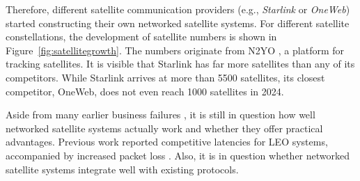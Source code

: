 Therefore, different satellite communication providers (e.g., \textit{Starlink} or \textit{OneWeb}) started constructing their own networked satellite systems.
For different satellite constellations, the development of satellite numbers is shown in Figure~\ref{fig:satellitegrowth}. The numbers originate from N2YO \cite{N2YO2024}, a platform for tracking satellites.
It is visible that Starlink has far more satellites than any of its competitors. While Starlink arrives at more than 5500 satellites, its closest competitor, OneWeb, does not even reach 1000 satellites in 2024.

Aside from many earlier business failures \cite{Chan2002, Barboza2000}, it is still in question how well networked satellite systems actually work and whether they offer practical advantages. Previous work reported competitive latencies for \ac{LEO} systems, accompanied by increased packet loss \cite{DBLP:conf/imc/MichelTGB22}.
Also, it is in question whether networked satellite systems integrate well with existing protocols.

